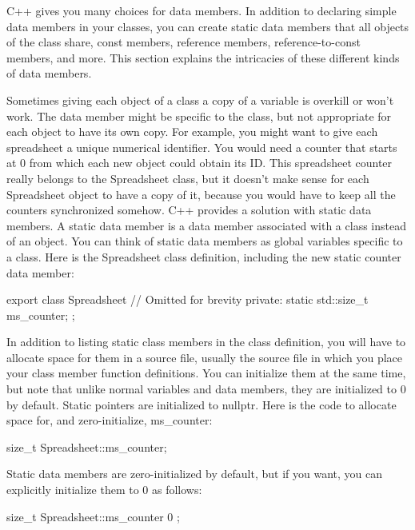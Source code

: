 
C++ gives you many choices for data members. In addition to declaring simple data members in your classes, you can create static data members that all objects of the class share, const members, reference members, reference-to-const members, and more. This section explains the intricacies of these different kinds of data members.


Sometimes giving each object of a class a copy of a variable is overkill or won’t work. The data member might be specific to the class, but not appropriate for each object to have its own copy. For example, you might want to give each spreadsheet a unique numerical identifier. You would need a counter that starts at 0 from which each new object could obtain its ID. This spreadsheet counter really belongs to the Spreadsheet class, but it doesn’t make sense for each Spreadsheet object to have a copy of it, because you would have to keep all the counters synchronized somehow. C++ provides a solution with static data members. A static data member is a data member associated with a class instead of an object. You can think of static data members as global variables specific to a class. Here is the Spreadsheet class definition, including the new static counter data member:

\begin{cpp}
export class Spreadsheet
{
    // Omitted for brevity
    private:
    static std::size_t ms_counter;
};
\end{cpp}

In addition to listing static class members in the class definition, you will have to allocate space for them in a source file, usually the source file in which you place your class member function definitions. You can initialize them at the same time, but note that unlike normal variables and data members, they are initialized to 0 by default. Static pointers are initialized to nullptr. Here is the code to allocate space for, and zero-initialize, ms\_counter:

\begin{cpp}
size_t Spreadsheet::ms_counter;
\end{cpp}

Static data members are zero-initialized by default, but if you want, you can explicitly initialize them to 0 as follows:

\begin{cpp}
size_t Spreadsheet::ms_counter { 0 };
\end{cpp}

